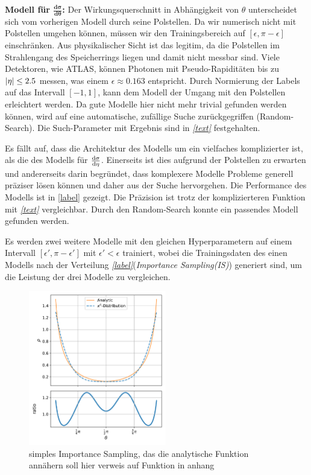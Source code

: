 \textbf{Modell für $\mathbf{\frac{d\sigma}{d\theta}}$:} %
Der Wirkungsquerschnitt in Abhängigkeit von $\theta$ unterscheidet sich vom vorherigen Modell durch seine Polstellen. Da wir numerisch nicht mit Polstellen umgehen können, müssen wir den Trainingsbereich auf $[\epsilon, \pi-\epsilon]$ einschränken. Aus physikalischer Sicht ist das legitim, da die Polstellen im Strahlengang des Speicherrings liegen und damit nicht messbar sind. Viele Detektoren, wie ATLAS, können Photonen mit Pseudo-Rapiditäten bis zu $\abs{\eta} \leq 2.5$ messen, was einem $\epsilon \approx 0.163$ entspricht. Durch Normierung der Labels auf das Intervall $[-1, 1]$, kann dem Modell der Umgang mit den Polstellen erleichtert werden. Da gute Modelle hier nicht mehr trivial gefunden werden können, wird auf eine automatische, zufällige Suche zurückgegriffen (Random-Search). Die Such-Parameter mit Ergebnis sind in \textit{\autoref{text}} festgehalten.

Es fällt auf, dass die Architektur des Modells um ein vielfaches komplizierter ist, als die des Modells für $\derivative{\sigma}{\eta}$. Einerseits ist dies aufgrund der Polstellen zu erwarten und andererseits darin begründet, dass komplexere Modelle Probleme generell präziser lösen können und daher aus der Suche hervorgehen. Die Performance des Modells ist in \textit{}\autoref{label} gezeigt. Die Präzision ist trotz der komplizierteren Funktion mit \textit{\autoref{text}} vergleichbar. Durch den Random-Search konnte ein passendes Modell gefunden werden. %

Es werden zwei weitere Modelle mit den gleichen Hyperparametern auf einem Intervall $[\epsilon', \pi-\epsilon']$ mit $\epsilon' < \epsilon$ trainiert, wobei die Trainingsdaten des einen Modells nach der Verteilung \textit{\autoref{label}}(\textit{Importance Sampling(IS)}) generiert sind, um die Leistung der drei Modelle zu vergleichen. 
\begin{figure}
	\centering
	\includegraphics[width=6cm]{graphics/4}
	\caption{simples Importance Sampling, das die analytische Funktion annähern soll hier verweis auf Funktion in anhang}
\end{figure}

